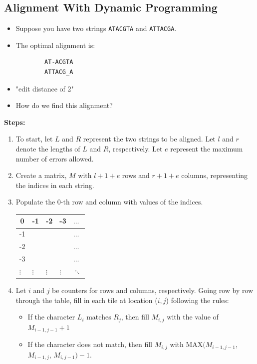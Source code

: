 \documentclass[10pt]{article}
\begin{document}
\subsection*{Alignment With Dynamic Programming}
\begin{itemize}
    \item Suppose you have two strings \texttt{ATACGTA} and \texttt{ATTACGA}.
    \item The optimal alignment is:
    \begin{verbatim}
        AT-ACGTA
        ATTACG_A
    \end{verbatim}
    \item "edit distance of 2"
    \item How do we find this alignment?
\end{itemize}
\textbf{Steps:}
\begin{enumerate}
    \item To start, let $L$ and $R$ represent the two strings to be aligned.  Let $l$ and $r$ denote the lengths of $L$ and $R$, respectively.  Let $e$ represent the maximum number of errors allowed.
    \item Create a matrix, $M$ with $l + 1 + e$ rows and $r + 1 + e$ columns, representing the indices in each string.
    \item Populate the $0$-th row and column with values of the indices.
    \begin{center}
    \begin{tabular}{|l|l|l|l|l}
        \hline
        \multicolumn{1}{|c|}{0} & \multicolumn{1}{c|}{-1} & -2 & -3 & $\dots$ \\ \hline
        \multicolumn{1}{|c|}{-1} & \multicolumn{1}{c|}{} &  &  & $\dots$ \\ \hline
        -2 &  &  &  & $\dots$ \\ \hline
        -3 &  &  &  & $\dots$ \\ \hline
        $\vdots$ & $\vdots$ & $\vdots$ & $\vdots$ & $\ddots$
    \end{tabular}
    \end{center}
    \item Let $i$ and $j$ be counters for rows and columns, respectively.  Going row by row through the table, fill in each tile at location ($i, j$) following the rules:
    \begin{itemize}
        \item If the character $L_i$ matches $R_j$, then fill $M_{i, j}$ with the value of $M_{i - 1, j - 1} + 1$
        \item If the character does not match, then fill $M_{i, j}$ with MAX$(M_{i - 1, j - 1}$, $M_{i - 1, j}$, $M_{i, j - 1}) - 1$.

\end{itemize}
\end{enumerate}
\end{document}
